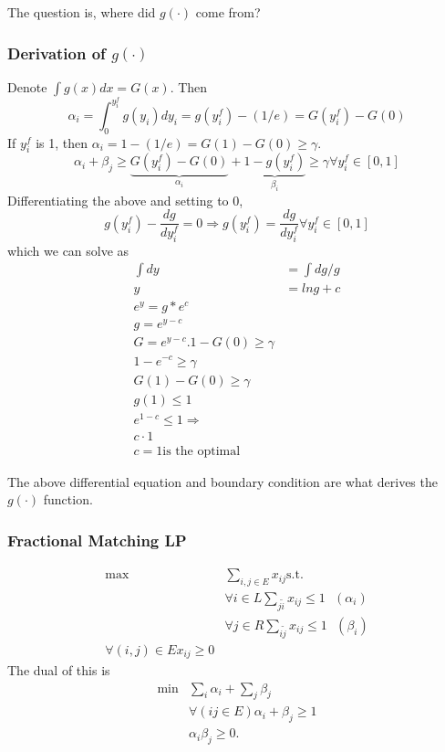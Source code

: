 The question is, where did $g(\cdot)$ come from?
\subsubsection{Derivation of $g(\cdot)$}
Denote $\int g(x) dx = G(x)$. Then
\begin{equation*}
  \alpha_{i} = \int_{0}^{y_{i}^{f}} g(y_{i}) dy_{i} = g(y_{i}^{f}) - (1/e) = G(y_{i}^{f}) - G(0)
\end{equation*}
If $y_{i}^{f}$ is 1, then $\alpha_{i} = 1  - (1/e) = G(1) - G(0) \geq \gamma$.
\begin{equation*}
    \alpha_{i} + \beta_{j} 
    \geq \underbrace{G(y_{i}^{f}) - G(0)}_{\alpha_{i}} + \underbrace{1 - g(y_{i}^{f})}_{\beta_{i}} \geq \gamma \forall y_{i}^{f} \in [0,1]
\end{equation*}
Differentiating the above and setting to 0,
\begin{equation*}
  g(y_{i}^{f}) - \frac{dg}{d y_{i}^{f}} = 0 \Rightarrow   g(y_{i}^{f}) = \frac{dg}{d y_{i}^{f}} \forall y_{i}^{f} \in [0,1]
\end{equation*}
which we can solve as
\begin{align*}
  \int dy &= \int dg/g \\
  y &= ln g + c \\
  e^{y} = g * e^{c} \\
  g =e^{y-c} \\ 
  G = e^{y-c}.
  1-G(0) \geq \gamma \\
  1 - e^{-c} \geq \gamma \\
  G(1) - G(0) \geq \gamma \\
  g(1) \leq 1 \\
  e^{1-c} \leq 1  \Rightarrow \\
c \cdot 1 \\
c = 1 \mbox{is the optimal}
\end{align*}

The above differential equation and boundary condition are what derives the $g(\cdot)$ function.

\subsubsection{Fractional Matching LP}
\begin{align*}
  \max &\sum_{i,j \in E}  x_{ij} \mbox{s.t.} \\
  &\forall i \in L \sum_{j \tilde i} x_{ij } \leq 1  ~~~(\alpha_{i}) \\
  &\forall j \in R \sum_{i \tilde j} x_{ij } \leq 1  ~~~(\beta_{i}) \\   
  \forall (i,j) \in E x_{ij} \geq 0
\end{align*}
The dual of this is
\begin{align*}
  \min &\sum_{i} \alpha_{i} + \sum_{j} \beta_{j} \\
  &\forall (ij \in E) \alpha_{i} + \beta_{j} \geq 1 \\
  &\alpha_{i}\beta_{j} \geq 0.
\end{align*}


